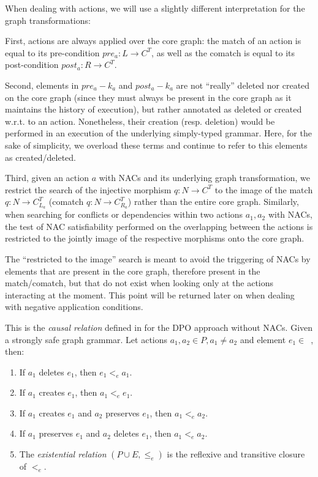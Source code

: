 \begin{remark} When dealing with actions, we will use a slightly different interpretation for the graph transformations:
  
First, actions are always applied over the core graph: the match of an action is equal to its pre-condition $pre_a : L \rightarrow C^T$, as well as the comatch is equal to its post-condition $post_a : R \rightarrow C^T$. 
  
  Second, elements in $pre_a - k_a$ and $post_a - k_a$ are not ``really'' deleted nor created on the core graph (since they must always be present in the core graph as it maintains the history of execution), but rather annotated as deleted or created w.r.t. to an action. Nonetheless, their creation (resp. deletion) would be performed in an execution of the underlying simply-typed grammar. Here, for the sake of simplicity, we overload these terms and continue to refer to this elements as created/deleted.

  Third, given an action $a$ with NACs and its underlying graph transformation, we restrict the search of the injective morphism $q : N \rightarrow C^T$ to the image of the match $q : N \rightarrow C^T_{L_a}$ (comatch $q : N \rightarrow C^T_{R_a}$) rather than the entire core graph. Similarly, when searching for conflicts or dependencies within two actions $a_1, a_2$ with NACs, the test of NAC satisfiability performed on the overlapping between the actions is restricted to the jointly image of the respective morphisms onto the core graph.

  The ``restricted to the image'' search is meant to avoid the triggering of NACs by elements that are present in the core graph, therefore present in the match/comatch, but that do not exist when looking only at the actions interacting at the moment. This point will be returned later on when dealing with negative application conditions.
\end{remark}

\begin{definition} This is the \emph{causal relation} defined in \cite{Corradini1996} for the DPO approach without NACs. Given  \doublyTypedGraphGrammarCore{} a strongly safe graph grammar. Let actions \mbox{$a_1, a_2 \in P, a_1 \ne a_2$} and element \mbox{$e_1 \in $ \coreGraph{}}, then:

  \begin{enumerate}
    \item If $a_1$ deletes $e_1$, then $e_1 <_e a_1$.
    \item If $a_1$ creates $e_1$, then $a_1 <_e e_1$.
    \item If $a_1$ creates $e_1$ and $a_2$ preserves $e_1$, then $a_1 <_e a_2$.
    \item If $a_1$ preserves $e_1$ and $a_2$ deletes $e_1$, then $a_1 <_e a_2$. 
    \item The \emph{existential relation} $(P \cup E, \leq_e)$ is the reflexive and transitive closure of $<_e$.
  \end{enumerate}
\end{definition}

